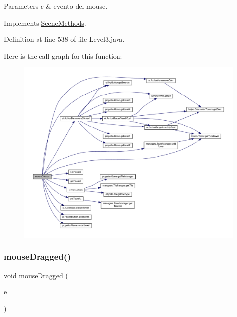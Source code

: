 \begin{DoxyParams}{Parameters}
{\em e} & evento del mouse. \\
\hline
\end{DoxyParams}


Implements \hyperlink{interfacescenes_1_1_scene_methods_a45d56bd84238e8b56589dfc732e2b2cf}{Scene\+Methods}.



Definition at line 538 of file Level3.\+java.

Here is the call graph for this function\+:
\nopagebreak
\begin{figure}[H]
\begin{center}
\leavevmode
\includegraphics[width=350pt]{classscenes_1_1_level3_a45d56bd84238e8b56589dfc732e2b2cf_cgraph}
\end{center}
\end{figure}
\mbox{\label{classscenes_1_1_level3_adbfc0588c017133c9b7070474402b72f}} 
\subsubsection{\texorpdfstring{mouse\+Dragged()}{mouseDragged()}}
{\footnotesize\ttfamily void mouse\+Dragged (\begin{DoxyParamCaption}\item[{Mouse\+Event}]{e }\end{DoxyParamCaption})}



